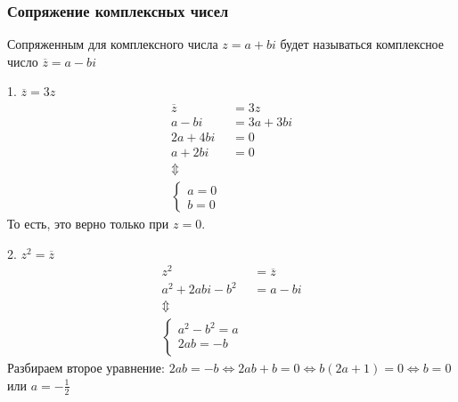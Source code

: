 \documentclass[12pt, a4paper]{article}
\begin{document}
    
    \subsubsection{Сопряжение комплексных чисел}
    \begin{definition}
        Сопряженным для комплексного числа \( z = a + bi \) будет называться комплексное число \( \overline{z} = a - bi \)
    \end{definition}

    \begin{exmp}
        \item 1. \( \overline{z} = 3z \)
            \begin{align*}
                \overline{z} &= 3z \\
                a - bi &= 3a + 3bi \\
                2a + 4bi &= 0 \\
                a + 2bi &= 0 \\
                 \Updownarrow \\
            \begin{cases*}
                a = 0 \\
                b = 0 
            \end{cases*} 
            \end{align*} 
            То есть, это верно только при \( z = 0 \).
        \item 2. \( z^2 = \overline{z} \)
            \begin{align*}
                z^2 & = \overline{z} \\
                a^2 + 2abi - b^2 & = a - bi \\
                \Updownarrow \\
                \begin{cases} 
                    a^2 - b^2  = a \\
                    2ab = - b \\
                \end{cases}
            \end{align*}
            Разбираем второе уравнение: \( 2ab = -b \iff 2ab + b = 0 \iff b(2a + 1) = 0 \iff b = 0 \) или \( a = - \frac{1}{2} \)


\end{exmp}
\end{document}
